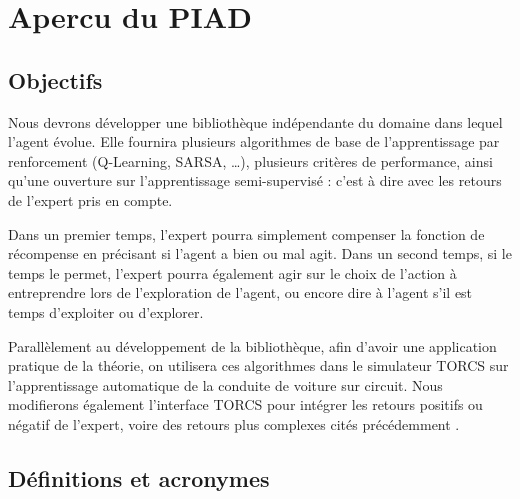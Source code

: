 \documentclass[a4paper,12pt]{article}
\begin{document}
  \begin{titlepage}
   \def\titletype{Plan de développement}
   
  \end{titlepage}

  
  \clearpage

  \tableofcontents

  \clearpage
  
  \renewcommand{\labelitemi}{$\bullet$}
  \renewcommand{\labelitemii}{$\circ$}
  \renewcommand{\labelitemiii}{$\diamond$}
  \renewcommand{\labelitemiv}{$\ast$}
  
  \section{Apercu du PIAD} 

  \subsection{Objectifs}
	Nous devrons développer une bibliothèque indépendante du domaine dans lequel l'agent évolue. 
	Elle fournira plusieurs algorithmes de base de l'apprentissage par renforcement  (Q-Learning, SARSA, …), 
	plusieurs critères de performance, ainsi qu'une ouverture sur l'apprentissage semi-supervisé : 
	c'est à dire avec les retours de l'expert pris en compte. 
	
	Dans un premier temps, l'expert pourra simplement compenser la fonction de récompense en précisant si 
	l'agent a bien ou mal agit. Dans un second temps, si le temps le permet, l'expert pourra également agir 
	sur le choix de l'action à entreprendre lors de l'exploration de l'agent, ou encore dire à l'agent s'il 
	est temps d'exploiter ou d'explorer.
	
	Parallèlement au développement de la bibliothèque, afin d'avoir une application pratique de la théorie,
	on utilisera ces algorithmes dans le simulateur TORCS sur l'apprentissage automatique de la conduite de 
	voiture sur circuit. Nous modifierons également l'interface TORCS pour intégrer les retours positifs ou 
	négatif de l'expert, voire des retours plus complexes cités précédemment \cite{CdC}.

  
  \nocite{TORCS}
  
  
  

     

  \subsection{Définitions et acronymes} 
  
\end{document}
